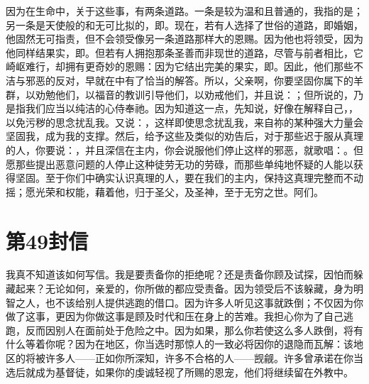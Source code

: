 因为在生命中，关于这些事，有两条道路。一条是较为温和且普通的，我指的是；另一条是天使般的和无可比拟的，即。现在，若有人选择了世俗的道路，即婚姻，他固然无可指责，但不会领受像另一条道路那样大的恩赐。因为他也将领受，因为他同样结果实，即。但若有人拥抱那条圣善而非现世的道路，尽管与前者相比，它崎岖难行，却拥有更奇妙的恩赐：因为它结出完美的果实，即。因此，他们那些不洁与邪恶的反对，早就在中有了恰当的解答。所以，父亲啊，你要坚固你属下的羊群，以劝勉他们，以福音的教训引导他们，以劝戒他们，并且说：；但所说的，乃是指我们应当以纯洁的心侍奉祂。因为知道这一点，先知说，好像在解释自己，，以免污秽的思念扰乱我。又说：，这样即使思念扰乱我，来自祢的某种强大力量会坚固我，成为我的支撑。然后，给予这些及类似的劝告后，对于那些迟于服从真理的人，你要说：，并且深信在主内，你会说服他们停止这样的邪恶，就歌唱：。但愿那些提出恶意问题的人停止这种徒劳无功的劳碌，而那些单纯地怀疑的人能以获得坚固。至于你们中确实认识真理的人，要在我们的主内，保持这真理完整而不动摇；愿光荣和权能，藉着他，归于圣父，及圣神，至于无穷之世。阿们。\par



\section{第49封信}

\par

我真不知道该如何写信。我是要责备你的拒绝呢？还是责备你顾及试探，因怕而躲藏起来？无论如何，亲爱的，你所做的都应受责备。因为领受后不该躲藏，身为明智之人，也不该给别人提供逃跑的借口。因为许多人听见这事就跌倒；不仅因为你做了这事，更因为你做这事是顾及时代和压在身上的苦难。我担心你为了自己逃跑，反而因别人在面前处于危险之中。因为如果，那么你若使这么多人跌倒，将有什么等着你呢？因为在地区，你当选时那惊人的一致必将因你的退隐而瓦解：该地区的将被许多人——正如你所深知，许多不合格的人——觊觎。许多曾承诺在你当选后就成为基督徒，如果你的虔诚轻视了所赐的恩宠，他们将继续留在外教中。\par

